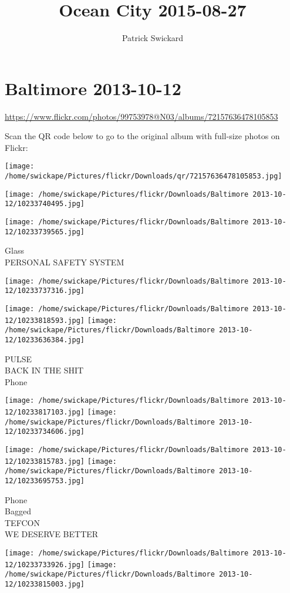 \documentclass[10pt,letterpaper]{article}
\title{Ocean City 2015-08-27}
\author{Patrick Swickard}
\date{}
\begin{document}
\section*{Baltimore 2013-10-12}

\url{https://www.flickr.com/photos/99753978@N03/albums/72157636478105853}

Scan the QR code below to go to the original album with full-size photos on Flickr:

\texttt{[image: /home/swickape/Pictures/flickr/Downloads/qr/72157636478105853.jpg]}
\pagebreak

\texttt{[image: /home/swickape/Pictures/flickr/Downloads/Baltimore 2013-10-12/10233740495.jpg]}

\vspace{0.25in}
\texttt{[image: /home/swickape/Pictures/flickr/Downloads/Baltimore 2013-10-12/10233739565.jpg]}

Glass\\
PERSONAL SAFETY SYSTEM
\pagebreak

\texttt{[image: /home/swickape/Pictures/flickr/Downloads/Baltimore 2013-10-12/10233737316.jpg]}

\vspace{0.25in}
\texttt{[image: /home/swickape/Pictures/flickr/Downloads/Baltimore 2013-10-12/10233818593.jpg]}
\texttt{[image: /home/swickape/Pictures/flickr/Downloads/Baltimore 2013-10-12/10233636384.jpg]}

PULSE\\
BACK IN THE SHIT\\
Phone
\pagebreak

\texttt{[image: /home/swickape/Pictures/flickr/Downloads/Baltimore 2013-10-12/10233817103.jpg]}
\texttt{[image: /home/swickape/Pictures/flickr/Downloads/Baltimore 2013-10-12/10233734606.jpg]}

\texttt{[image: /home/swickape/Pictures/flickr/Downloads/Baltimore 2013-10-12/10233815783.jpg]}
\texttt{[image: /home/swickape/Pictures/flickr/Downloads/Baltimore 2013-10-12/10233695753.jpg]}

Phone\\
Bagged\\
TEFCON\\
WE DESERVE BETTER
\pagebreak

\texttt{[image: /home/swickape/Pictures/flickr/Downloads/Baltimore 2013-10-12/10233733926.jpg]}
\texttt{[image: /home/swickape/Pictures/flickr/Downloads/Baltimore 2013-10-12/10233815003.jpg]}
\end{document}
